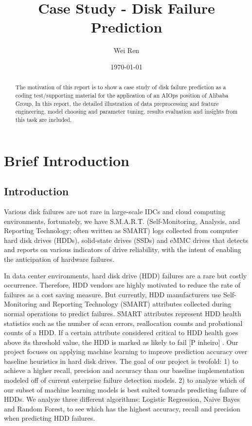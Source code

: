 \documentclass[12pt,a4paper,english]{amsart}
\begin{document}
\title{Case Study - Disk Failure Prediction}%
\author{Wei Ren}%
%

\date{\today}
\begin{abstract}
  The motivation of this report is to show a case study of disk failure prediction as a coding test/supporting material for the application of an AIOps position of Alibaba Group.
  In this report, the detailed illustration of data preprocessing and feature engineering, model choosing and parameter tuning, results evaluation and insights from this task are included.
\end{abstract}
\maketitle
\section{Brief Introduction}

\subsection{Introduction}

Various disk failures are not rare in large-scale IDCs and cloud computing environments, fortunately, we have S.M.A.R.T. (Self-Monitoring, Analysis, and Reporting Technology; often written as SMART) logs collected from computer hard disk drives (HDDs), solid-state drives (SSDs) and eMMC drives that detects and reports on various indicators of drive reliability, with the intent of enabling the anticipation of hardware failures.

In data center environments, hard disk drive (HDD) failures are a rare but costly occurrence. Therefore, HDD vendors are highly motivated to reduce the rate of failures as a cost saving measure. But currently, HDD manufacturers use Self-Monitoring and Reporting Technology (SMART) attributes collected during normal operations to predict failures. SMART attributes represent HDD health statistics such as the number of scan errors, reallocation counts and probational counts of a HDD. If a certain attribute considered critical to HDD health goes above  its  threshold  value,  the  HDD  is  marked  as  likely  to  fail  [P  inheiro] .
Our project focuses on applying machine learning to improve prediction accuracy over baseline heuristics in hard disk drives. The goal of our project is twofold: 1) to achieve a higher recall, precision and accuracy than our baseline implementation modeled off of current enterprise failure detection models. 2) to analyze which of our subset of machine learning models is best suited towards predicting failure of HDDs. We analyze three different algorithms: Logistic Regression, Naive Bayes and Random Forest, to see which has the highest accuracy, recall and precision when   predicting   HDD   failures.
\end{document}
